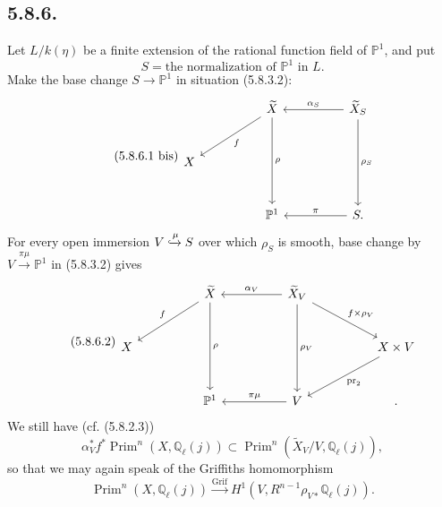 \subsection*{5.8.6.}
Let $L/k(\eta)$ be a finite extension of the rational function field of
$\mathbb P^1$, and put
\begin{equation}\tag{5.8.6.1}
S=\text{the normalization of $\mathbb P^1$ in $L$}.
\end{equation}
Make the base change $S\to\mathbb P^1$ in situation (5.8.3.2):
\begin{equation}\tag{5.8.6.1 bis}
\begin{tikzcd}[column sep=huge,row sep=large]
{} & \widetilde X \arrow[dl,"f"] \arrow[dd,"\rho"]
& \widetilde X_S \arrow[l,"\alpha_S"'] \arrow[dd,"\rho_S"] \\
X&{}&{} \\
{} & \mathbb P^1 & S\arrow[l,"\pi"'] .
\end{tikzcd}
\end{equation}
For every open immersion $V\xhookrightarrow{\mu}S$ over which $\rho_S$
is smooth, base change by $V\xrightarrow{\pi\mu}\mathbb P^1$ in
(5.8.3.2) gives
\begin{equation}\tag{5.8.6.2}
\begin{tikzcd}[column sep=huge,row sep=large]
{} & \widetilde X \arrow[dl,"f"'] \arrow[dd,"\rho"]
& \widetilde X_V \arrow[l,"\alpha_V"'] \arrow[dd,"\rho_V"]
  \arrow[dr,"f\times\rho_V"] &{} \\
X&{}&{}&X\times V\arrow[dl,"\operatorname{pr}_2"] \\
{} & \mathbb P^1 & V\arrow[l,"\pi\mu"'] &{} .
\end{tikzcd}
\end{equation}
We still have (cf. (5.8.2.3))
\begin{equation}\tag{5.8.6.3}
\alpha_V^*f^*\operatorname{Prim}^n(X,\mathbb Q_\ell(j))
\subset
\operatorname{Prim}^n(\widetilde X_V/V,\mathbb Q_\ell(j)),
\end{equation}
so that we may again speak of the Griffiths homomorphism
\begin{equation}\tag{5.8.6.4}
\operatorname{Prim}^n(X,\mathbb Q_\ell(j))
\xrightarrow{\operatorname{Grif}}
H^1(V,R^{n-1}\rho_{V*}\mathbb Q_\ell(j)).
\end{equation}

